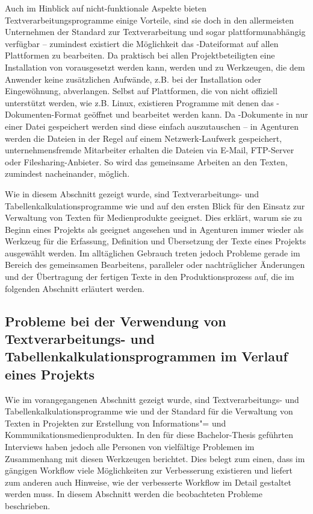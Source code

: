 \bigskip

Auch im Hinblick auf nicht-funktionale Aspekte bieten Textverarbeitungsprogramme einige Vorteile, sind sie doch in den allermeisten Unternehmen der Standard zur Textverarbeitung und sogar plattformunabhängig verfügbar -- zumindest existiert die Möglichkeit das -Dateiformat auf allen Plattformen zu bearbeiten. Da praktisch bei allen Projektbeteiligten eine Installation von  vorausgesetzt werden kann, werden  und  zu  Werkzeugen, die dem Anwender keine zusätzlichen Aufwände, z.B. bei der Installation oder Eingewöhnung, abverlangen. Selbst auf Plattformen, die von  nicht offiziell unterstützt werden, wie z.B. Linux, existieren Programme mit denen das -Dokumenten-Format geöffnet und bearbeitet werden kann. Da -Dokumente in nur einer Datei gespeichert werden sind diese einfach auszutauschen -- in Agenturen werden die Dateien in der Regel auf einem Netzwerk-Laufwerk gespeichert, unternehmensfremde Mitarbeiter erhalten die Dateien via E-Mail, FTP-Server oder Filesharing-Anbieter. So wird das gemeinsame Arbeiten an den Texten, zumindest nacheinander, möglich. 

\secbar

Wie in diesem Abschnitt gezeigt wurde, sind Textverarbeitungs- und Tabellenkalkulationsprogramme wie   und  auf den ersten Blick für den Einsatz zur Verwaltung von Texten für Medienprodukte geeignet. Dies erklärt, warum sie zu Beginn eines Projekts als geeignet angesehen und in Agenturen immer wieder als Werkzeug für die Erfassung, Definition und Übersetzung der Texte eines Projekts ausgewählt werden. Im alltäglichen Gebrauch treten jedoch Probleme gerade im Bereich des gemeinsamen Bearbeitens, paralleler oder nachträglicher Änderungen und der Übertragung der fertigen Texte in den Produktionsprozess auf, die im folgenden Abschnitt erläutert werden.

\pagebreak

\subsection{Probleme bei der Verwendung von Textverarbeitungs- und Tabellenkalkulationsprogrammen im Verlauf eines Projekts}
\label{l:officeprobleme}

Wie im vorangegangenen Abschnitt gezeigt wurde, sind Textverarbeitungs- und Tabellenkalkulationsprogramme wie   und  der Standard für die Verwaltung von Texten in Projekten zur Erstellung von Informations"= und Kommunikationsmedienprodukten. In den für diese Bachelor-Thesis geführten Interviews haben jedoch alle Personen von vielfältige Problemen im Zusammenhang mit diesen Werkzeugen berichtet. Dies belegt zum einen, dass im gängigen Workflow viele Möglichkeiten zur Verbesserung existieren und liefert zum anderen auch Hinweise, wie der verbesserte Workflow im Detail gestaltet werden muss. In diesem Abschnitt werden die beobachteten Probleme beschrieben.

